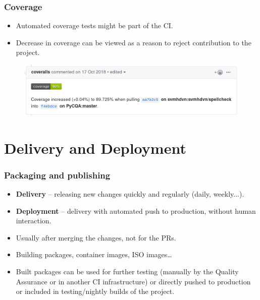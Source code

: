 \documentclass[aspectratio=169]{beamer}
\begin{document}
\begin{frame}
	\frametitle{Coverage}
	
	\begin{block}{}
		\begin{itemize}
			\item Automated coverage tests might be part of the CI.
			\item Decrease in coverage can be viewed as a reason to reject contribution to the project.
		\end{itemize}
	\end{block}
	
	\begin{figure}[ht!]
	\begin{center}
  	  \includegraphics[width=12.5cm]{img/coverage-bot.png}
	\end{center}
	\end{figure}
\end{frame}

\section{Delivery and Deployment}

\begin{frame}
	\frametitle{Packaging and publishing}
	
	\begin{block}{}
		\begin{itemize}
			\item \textbf{Delivery} -- releasing new changes quickly and regularly (daily, weekly...).
			\item \textbf{Deployment} -- delivery with automated push to production, without human interaction.
		\end{itemize}
	\end{block}
	
	\begin{block}{}
		\begin{itemize}
			\item Usually after merging the changes, not for the PRs.
			\item Building packages, container images, ISO images…
			\item Built packages can be used for further testing (manually by the Quality Assurance or in another CI infrastructure) or directly pushed to production or included in testing/nightly builds of the project.
		\end{itemize}
	\end{block}
\end{frame}
\end{document}
